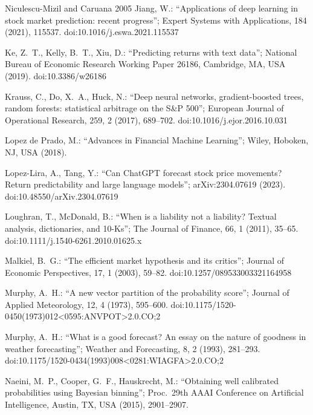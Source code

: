 \documentclass[10pt, a4paper, oneside]{article}
\theoremstyle{definition}
\theoremstyle{plain}
\begin{document}
{\begin{thebibliography}{Niculescu-Mizil and Caruana 2005}
Jiang, W.: ``Applications of deep learning in stock market prediction: recent
progress''; Expert Systems with Applications, 184 (2021), 115537.
doi:10.1016/j.eswa.2021.115537

Ke, Z.\ T., Kelly, B.\ T., Xiu, D.: ``Predicting returns with text data''; National
Bureau of Economic Research Working Paper 26186, Cambridge, MA, USA (2019).
doi:10.3386/w26186

Krauss, C., Do, X.\ A., Huck, N.: ``Deep neural networks, gradient-boosted trees,
random forests: statistical arbitrage on the S\&P 500''; European Journal of
Operational Research, 259, 2 (2017), 689--702. doi:10.1016/j.ejor.2016.10.031

Lopez de Prado, M.: ``Advances in Financial Machine Learning''; Wiley, Hoboken, NJ,
USA (2018).

Lopez-Lira, A., Tang, Y.: ``Can ChatGPT forecast stock price movements? Return
predictability and large language models''; arXiv:2304.07619 (2023).
doi:10.48550/arXiv.2304.07619

Loughran, T., McDonald, B.: ``When is a liability not a liability? Textual analysis,
dictionaries, and 10-Ks''; The Journal of Finance, 66, 1 (2011), 35--65.
doi:10.1111/j.1540-6261.2010.01625.x

Malkiel, B.\ G.: ``The efficient market hypothesis and its critics''; Journal of
Economic Perspectives, 17, 1 (2003), 59--82. doi:10.1257/089533003321164958

Murphy, A.\ H.: ``A new vector partition of the probability score''; Journal of Applied
Meteorology, 12, 4 (1973), 595--600.
doi:10.1175/1520-0450(1973)012<0595:ANVPOT>2.0.CO;2

Murphy, A.\ H.: ``What is a good forecast? An essay on the nature of goodness in weather
forecasting''; Weather and Forecasting, 8, 2 (1993), 281--293.
doi:10.1175/1520-0434(1993)008<0281:WIAGFA>2.0.CO;2

Naeini, M.\ P., Cooper, G.\ F., Hauskrecht, M.: ``Obtaining well calibrated
probabilities using Bayesian binning''; Proc.\ 29th AAAI Conference on Artificial
Intelligence, Austin, TX, USA (2015), 2901--2907.


\end{thebibliography}}
\end{document}
